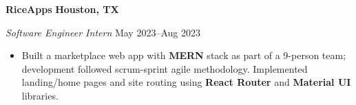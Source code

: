 \textbf{RiceApps} \hfill \textbf{Houston, TX}\par
\textit{Software Engineer Intern} \hfill May 2023--Aug 2023

\begin{itemize}
    \item Built a marketplace web app with \textbf{MERN} stack as part of a 9-person team; development followed scrum-sprint agile methodology. Implemented landing/home pages and site routing using \textbf{React Router} and \textbf{Material UI} libraries.
\end{itemize}\par